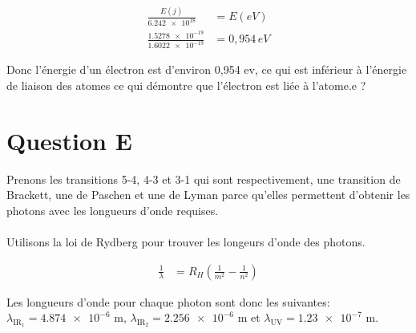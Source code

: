 \documentclass[11pt, letterpaper]{article}
\begin{document}
\begin{align*}
    \frac{E(j)}{\num{6.242e18}} &= E(eV)
   \\ \frac{\num{1.5278e-19}}{\num{1.6022e-19}} &= 0,954\, eV
\end{align*}

\begin{tcolorbox}
Donc l'énergie d'un électron est d'environ 0,954 ev, ce qui est inférieur à l'énergie de liaison des atomes ce qui démontre que l'électron est liée à l'atome.e ?
\end{tcolorbox}

\section*{Question E}
Prenons les transitions 5-4, 4-3 et 3-1 qui sont respectivement, une transition de Brackett, une de Paschen et une de Lyman parce qu'elles permettent d'obtenir les photons avec les longueurs d'onde requises.\\\\
Utilisons la loi de Rydberg pour trouver les longeurs d'onde des photons. 

\begin{align*}
    \frac{1}{\lambda} &=  R_H \left( \frac{1}{m^2} -  \frac{1}{n^2}  \right) 
\end{align*}

\begin{tcolorbox}
    Les longueurs d'onde pour chaque photon sont donc les suivantes: 
    $\lambda_{\text{IR}_1}=\num{4.874e-6}$ m, $\lambda_{\text{IR}_2}=\num{2.256e-6}$ m et $\lambda_{\text{UV}}=\num{1.23e-7}$ m. 
\end{tcolorbox}
\end{document}
